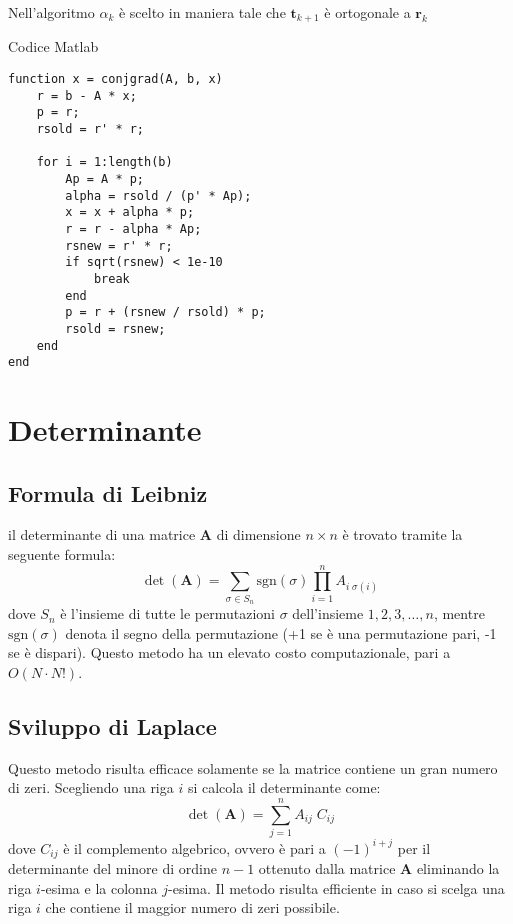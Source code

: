 \documentclass[10pt]{article}
\begin{document}
Nell'algoritmo $\alpha_k$ è scelto in maniera tale che $\mathbf{t}_{k+1}$ è ortogonale a $\mathbf{r}_k$

Codice Matlab
\begin{verbatim}
function x = conjgrad(A, b, x)
    r = b - A * x;
    p = r;
    rsold = r' * r;

    for i = 1:length(b)
        Ap = A * p;
        alpha = rsold / (p' * Ap);
        x = x + alpha * p;
        r = r - alpha * Ap;
        rsnew = r' * r;
        if sqrt(rsnew) < 1e-10
            break
        end
        p = r + (rsnew / rsold) * p;
        rsold = rsnew;
    end
end
\end{verbatim}



\section{Determinante}

\subsection{Formula di Leibniz}

il determinante di una matrice $\mathbf{A}$ di dimensione $n\times n$ è trovato tramite la seguente formula:
\begin{equation}
\det(\mathbf{A}) = \sum_{\sigma\in S_n} \text{sgn}(\sigma) \prod_{i=1}^n A_{i\;\sigma(i)}
\end{equation}
dove $S_n$ è l'insieme di tutte le permutazioni $\sigma$ dell'insieme ${1,2,3,\ldots,n}$, mentre $\text{sgn}(\sigma)$ denota il segno della permutazione (+1 se è una permutazione pari, -1 se è dispari).
Questo metodo ha un elevato costo computazionale, pari a $O(N\cdot N!)$.

\subsection{Sviluppo di Laplace}

Questo metodo risulta efficace solamente se la matrice contiene un gran numero di zeri. Scegliendo una riga $i$ si calcola il determinante come:
\begin{equation}
\det(\mathbf{A}) = \sum_{j=1}^n A_{ij} \; C_{ij}
\end{equation}
dove $C_{ij}$ è il complemento algebrico, ovvero è pari a $(-1)^{i+j}$ per il determinante del minore di ordine $n-1$ ottenuto dalla matrice $\mathbf{A}$ eliminando la riga $i$-esima e la colonna $j$-esima.
Il metodo risulta efficiente in caso si scelga una riga $i$ che contiene il maggior numero di zeri possibile.
\end{document}
